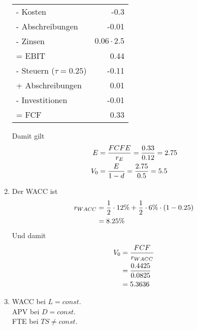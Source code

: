 \documentclass{article}
\begin{document}
\begin{enumerate}[label=(\alph*)]
\begin{center}
\begin{tabular}{l|r}
				- Kosten & -0.3 \\
				- Abschreibungen & -0.01 \\
				- Zinsen & $0.06\cdot 2.5$ \\
				\hline
				= EBIT & 0.44 \\
				- Steuern ($\tau=0.25$) & -0.11 \\
				+ Abschreibungen & 0.01 \\
				- Investitionen & -0.01 \\
				\hline
				= FCF & 0.33
			\end{tabular}
		\end{center}
		Damit gilt
		\begin{align}
			E &= \frac{FCFE}{r_E} = \frac{0.33}{0.12} = 2.75 \notag \\
			V_0 &= \frac{E}{1-d} = \frac{2.75}{0.5} = 5.5 \notag
		\end{align}
		\item Der WACC ist
		\begin{align}
			r_{WACC} &= \frac{1}{2}\cdot 12\% + \frac{1}{2}\cdot 6\%\cdot (1-0.25) \notag \\
			&= 8.25\% \notag
		\end{align}
		Und damit
		\begin{align}
			V_0 &= \frac{FCF}{r_{WACC}} \notag \\
			&= \frac{0.4425}{0.0825} \notag \\
			&= 5.3636 \notag
		\end{align}
		\item WACC bei $L=const.$ \\
		APV bei $D=const.$ \\
		FTE bei $TS\neq const.$
	\end{enumerate}
	
\end{document}
